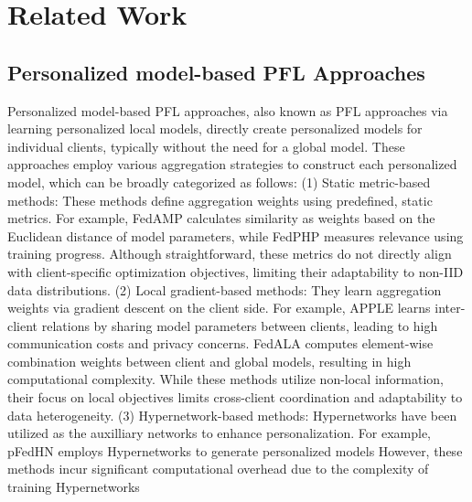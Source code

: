 \section{Related Work}
\subsection{Personalized model-based PFL Approaches}
Personalized model-based PFL approaches, also known as PFL approaches via learning personalized local models, directly create personalized models for individual clients, typically without the need for a global model. These approaches employ various aggregation strategies to construct each personalized model, which can be broadly categorized as follows:
(1)	Static metric-based methods: These methods define aggregation weights using predefined, static metrics. For example, FedAMP \cite{Huang_Chu_Zhou_Wang_Liu_Pei_Zhang_2021} calculates similarity as weights based on the Euclidean distance of model parameters, while FedPHP \cite{10.1007/978-3-030-86486-6_36} measures relevance using training progress. 
Although straightforward, these metrics do not directly align with client-specific optimization objectives, limiting their adaptability to non-IID data distributions.
(2) Local gradient-based methods: They learn aggregation weights via gradient descent on the client side. For example, APPLE \cite{ijcai2022p301} learns inter-client relations by sharing model parameters between clients, leading to high communication costs and privacy concerns. FedALA \cite{Zhang_Hua_Wang_Song_Xue_Ma_Guan_2023} computes element-wise combination weights between client and global models, resulting in high computational complexity. While these methods utilize non-local information, their focus on local objectives limits cross-client coordination and adaptability to data heterogeneity.
(3) Hypernetwork-based methods: Hypernetworks \cite{DBLP:journals/corr/HaDL16} have been utilized as the auxilliary networks to enhance personalization. For example, pFedHN \cite{pmlr-v139-shamsian21a} employs Hypernetworks to generate personalized models
However, these methods incur significant computational overhead due to the complexity of training Hypernetworks


